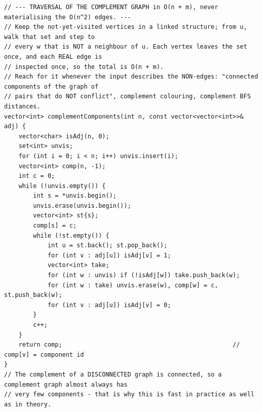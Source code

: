 \documentclass[9pt,a4paper,twocolumn]{extarticle}
\begin{document}
\begin{lstlisting}
// --- TRAVERSAL OF THE COMPLEMENT GRAPH in O(n + m), never materialising the O(n^2) edges. ---
// Keep the not-yet-visited vertices in a linked structure; from u, walk that set and step to
// every w that is NOT a neighbour of u. Each vertex leaves the set once, and each REAL edge is
// inspected once, so the total is O(n + m).
// Reach for it whenever the input describes the NON-edges: "connected components of the graph of
// pairs that do NOT conflict", complement colouring, complement BFS distances.
vector<int> complementComponents(int n, const vector<vector<int>>& adj) {
    vector<char> isAdj(n, 0);
    set<int> unvis;
    for (int i = 0; i < n; i++) unvis.insert(i);
    vector<int> comp(n, -1);
    int c = 0;
    while (!unvis.empty()) {
        int s = *unvis.begin();
        unvis.erase(unvis.begin());
        vector<int> st{s};
        comp[s] = c;
        while (!st.empty()) {
            int u = st.back(); st.pop_back();
            for (int v : adj[u]) isAdj[v] = 1;
            vector<int> take;
            for (int w : unvis) if (!isAdj[w]) take.push_back(w);
            for (int w : take) unvis.erase(w), comp[w] = c, st.push_back(w);
            for (int v : adj[u]) isAdj[v] = 0;
        }
        c++;
    }
    return comp;                                               // comp[v] = component id
}
// The complement of a DISCONNECTED graph is connected, so a complement graph almost always has
// very few components - that is why this is fast in practice as well as in theory.


\end{lstlisting}
\end{document}
